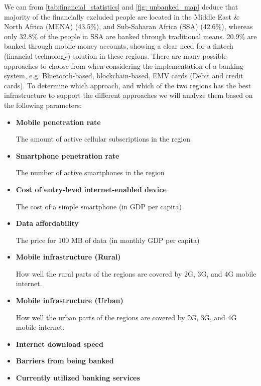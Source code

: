 \documentclass[11pt, a4paper]{article}
\begin{document}
\noindent We can from \autoref{tab:financial_statistics} and \autoref{fig: unbanked_map} deduce that majority of the financially excluded people are located in the Middle East \& North Africa (MENA) (43.5\%), and Sub-Saharan Africa (SSA) (42.6\%), whereas only 32.8\% of the people in SSA are banked through traditional means. 20.9\% are banked through mobile money accounts, showing a clear need for a fintech (financial technology) solution in these regions. There are many possible approaches to choose from when considering the implementation of a banking system, e.g. Bluetooth-based, blockchain-based, EMV cards (Debit and credit cards). To determine which approach, and which of the two regions has the best infrastructure to support the different approaches we will analyze them based on the following parameters:
\begin{itemize}
     \item \textbf{Mobile penetration rate}

     The amount of active cellular subscriptions in the region
     \item \textbf{Smartphone penetration rate}

     The number of active smartphones in the region
     \item \textbf{Cost of entry-level internet-enabled device}

     The cost of a simple smartphone (in GDP per capita)

     \item \textbf{Data affordability}

     The price for 100 MB of data (in monthly GDP per capita)

     \item \textbf{Mobile infrastructure (Rural)}

     How well the rural parts of the regions are covered by 2G, 3G, and 4G mobile internet.

     \item \textbf{Mobile infrastructure (Urban)}

     How well the urban parts of the regions are covered by 2G, 3G, and 4G mobile internet.

     \item \textbf{Internet download speed}

     \item \textbf{Barriers from being banked}

     \item \textbf{Currently utilized banking services}
 \end{itemize}
\end{document}
